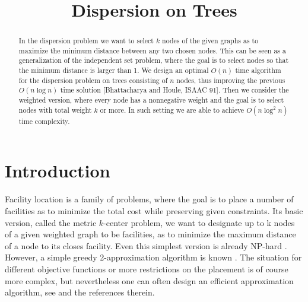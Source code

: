 \documentclass[11pt,a4paper]{article}
\newcommand{\Oh}{{O}}
\theoremstyle{definition}
\theoremstyle{remark}
\begin{document}
\title{Dispersion on Trees}
\author[1]{}


\date{}
\maketitle

\begin{abstract}
In the dispersion problem we want to select $k$ nodes of the given graphs as to maximize
the minimum distance between any two chosen nodes. This can be seen as a generalization
of the independent set problem, where the goal is to select nodes so that the minimum distance
is larger than 1.
We design an optimal $\Oh(n)$ time algorithm for the dispersion problem on trees consisting
of $n$ nodes, thus improving the previous $\Oh(n\log n)$ time solution
[Bhattacharya and Houle, ISAAC 91]. Then we consider the weighted version, where every
node has a nonnegative weight and the goal is to select nodes with total weight $k$ or
more. In such setting we are able to achieve $\Oh(n\log^2n)$ time complexity.
\end{abstract}

\section{Introduction}
Facility location is a family of problems, where the goal is to place
a number of facilities as to minimize the total cost while preserving
given constraints. Its basic version, called the metric $k$-center
problem, we want to designate up to k nodes of a given weighted graph
to be facilities, as to minimize the maximum distance of a node to its
closes facility. Even this simplest version is already NP-hard \cite{Vazirani2003}. However, a simple greedy 2-approximation algorithm is known \cite{Gonzalez1985}. The situation for different
objective functions or more restrictions on the placement is of course
more complex, but nevertheless one can often design an efficient
approximation algorithm, see \cite{DavidB.Shmoys1997} and the references
therein.
\end{document}
